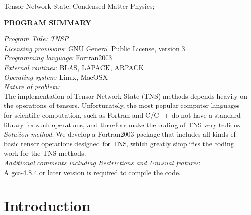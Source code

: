 \documentclass[preprint,3p,times,preprint,showpacs,amsmath,superscriptaddress,floatfix]{elsarticle}
\begin{document}
\begin{frontmatter}
\begin{keyword}
Tensor Network State; Condensed Matter Physics;


\end{keyword}

\end{frontmatter}





\begin{small}
\noindent
{\bf PROGRAM SUMMARY}

\noindent
{\em Program Title: TNSP}                                        \\
{\em Licensing provisions}: GNU General Public License, version 3\\
{\em Programming language:} Fortran2003                                   \\
{\em External routines:} BLAS, LAPACK, ARPACK\\
{\em Operating system:} Linux, MacOSX \\
{\em Nature of problem:} \\
The implementation of Tensor Network State (TNS) methods depends heavily on the operations of tensors.
Unfortunately, the most popular computer languages for scientific computation,
such as Fortran and C/C++ do not have a standard library for such operations, and therefore make the coding of TNS very tedious. \\
{\em Solution method}:
We develop a Fortran2003 package that includes all kinds of basic tensor operations
designed for TNS, which greatly simplifies the coding work for the TNS methods. \\
{\em Additional comments including Restrictions and Unusual features}:\\
A gcc-4.8.4 or later version is required to compile the code.\\

\end{small}


\section{Introduction}
\label{sec:introduction}
\end{document}
